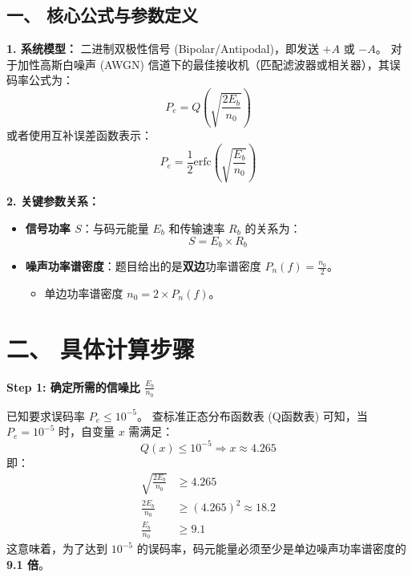 \documentclass[a4paper,11pt]{ctexart}
\begin{document}
\begin{tcolorbox}[colback=white, colframe=blue!50!black, title=\textbf{题目解答：9-6 最佳传输系统的最小信号功率计算}]

    \section*{一、 核心公式与参数定义}
    
    \textbf{1. 系统模型：}
    二进制双极性信号 (Bipolar/Antipodal)，即发送 $+A$ 或 $-A$。
    对于加性高斯白噪声 (AWGN) 信道下的最佳接收机（匹配滤波器或相关器），其误码率公式为：
    \begin{equation}
        P_e = Q\left( \sqrt{\frac{2E_b}{n_0}} \right)
    \end{equation}
    或者使用互补误差函数表示：
    \begin{equation}
        P_e = \frac{1}{2} \text{erfc}\left( \sqrt{\frac{E_b}{n_0}} \right)
    \end{equation}
    
    \textbf{2. 关键参数关系：}
    \begin{itemize}
        \item \textbf{信号功率 $S$}：与码元能量 $E_b$ 和传输速率 $R_b$ 的关系为：
            \begin{equation}
                S = E_b \times R_b
            \end{equation}
        \item \textbf{噪声功率谱密度}：题目给出的是\textbf{双边}功率谱密度 $P_n(f) = \frac{n_0}{2}$。
            \begin{itemize}
                \item 单边功率谱密度 $n_0 = 2 \times P_n(f)$。
            \end{itemize}
    \end{itemize}

    \end{tcolorbox}

    \section*{二、 具体计算步骤}
    
    \textbf{Step 1: 确定所需的信噪比 $\frac{E_b}{n_0}$}
    
    已知要求误码率 $P_e \le 10^{-5}$。
    查标准正态分布函数表 (Q函数表) 可知，当 $P_e = 10^{-5}$ 时，自变量 $x$ 需满足：
    $$ Q(x) \le 10^{-5} \Rightarrow x \approx 4.265 $$
    即：
    \begin{align*}
        \sqrt{\frac{2E_b}{n_0}} &\ge 4.265 \\
        \frac{2E_b}{n_0} &\ge (4.265)^2 \approx 18.2 \\
        \frac{E_b}{n_0} &\ge 9.1
    \end{align*}
    这意味着，为了达到 $10^{-5}$ 的误码率，码元能量必须至少是单边噪声功率谱密度的 \textbf{9.1 倍}。
    
\end{document}
